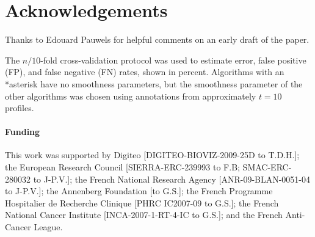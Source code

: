 \documentclass{bioinfo}
\begin{document}
\section*{Acknowledgements}
Thanks to Edouard Pauwels for helpful comments on an early draft of
the paper.
 



\begin{table}[b]
\begin{center}

\end{center}
\caption{\label{table-error-on-unseen-profiles}
  The $n/10$-fold cross-validation protocol was used to estimate
  error, false positive (FP), and false negative (FN) rates, 
  shown in percent.
  Algorithms with an *asterisk have no smoothness parameters, 
  but the smoothness parameter of the other algorithms was
  chosen using annotations from approximately $t=10$ profiles. 
}
\end{table}




\paragraph{Funding\textcolon}


This work was supported by Digiteo [DIGITEO-BIOVIZ-2009-25D to
T.D.H.]; the European Research Council [SIERRA-ERC-239993 to F.B; SMAC-ERC-280032 to J-P.V.];
the French National Research Agency [ANR-09-BLAN-0051-04 to J-P.V.]; the Annenberg Foundation [to G.S.];
the French Programme Hospitalier de Recherche Clinique [PHRC IC2007-09
to G.S.]; the French National Cancer Institute [INCA-2007-1-RT-4-IC to
G.S.]; and the French Anti-Cancer League.
\end{document}
